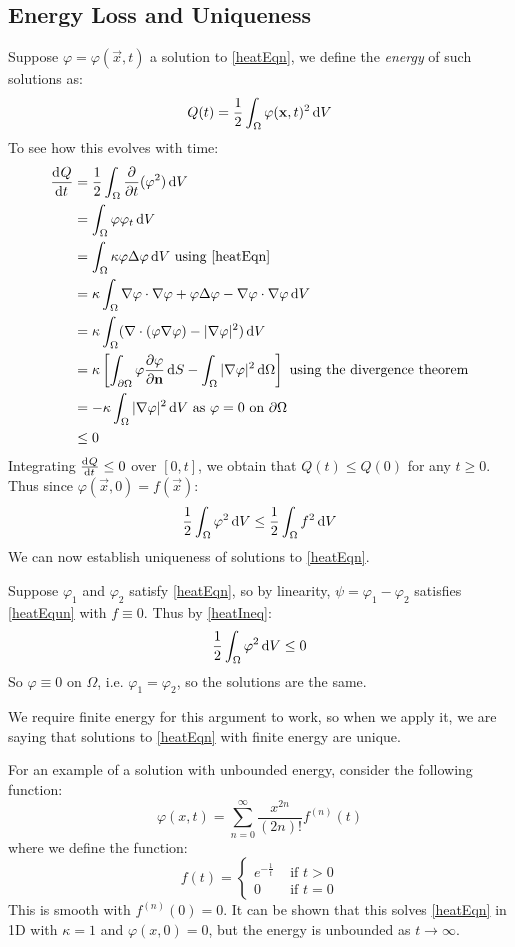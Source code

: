 \documentclass[../main.tex]{subfiles}
\begin{document}
\subsection{Energy Loss and Uniqueness}
Suppose $\varphi = \varphi(\vec{x}, t)$ a solution to \cref{heatEqn}, we define the \textit{energy} of such solutions as:
\[
  Q(t) = \frac{1}{2} \int_{\Omega} \varphi(\vec{x}, t)^2 \d{V}
\]
To see how this evolves with time:
\begin{align*}
  \deriv{Q}{t} &= \frac{1}{2} \int_{\Omega} \pderiv{}{t}(\varphi^2) \d{V} \\
               &= \int_{\Omega} \varphi \varphi_t \d{V} \\
               &= \int_{\Omega} \kappa \varphi \Delta \varphi \d{V} \text{ using \cref{heatEqn}} \\
               &= \kappa \int_{\Omega} \nabla \varphi \cdot \nabla \varphi + \varphi \Delta \varphi - \nabla \varphi \cdot \nabla \varphi \d{V} \\
               &= \kappa \int_{\Omega} (\nabla \cdot (\varphi \nabla \varphi) - |\nabla \varphi|^2) \d{V} \\
               &= \kappa \left[\int_{\partial \Omega} \varphi \pderiv{\varphi}{\vec{n}} \d{S} - \int_{\Omega}  |\nabla \varphi|^2 \d{\Omega}\right] \text{ using the divergence theorem} \\
               &= -\kappa \int_{\Omega} |\nabla \varphi|^2 \d{V} \text{ as $\varphi = 0$ on $\partial \Omega$} \\
               &\leq 0
\end{align*}
Integrating $\deriv{Q}{t} \leq 0$ over $[0, t]$, we obtain that $Q(t) \leq Q(0)$ for any $t \geq 0$.
Thus since $\varphi(\vec{x}, 0) = f(\vec{x})$:
\begin{equation}
  \frac{1}{2} \int_{\Omega} \varphi^2 \d{V} \leq \frac{1}{2} \int_{\Omega} f^2 \d{V} \label{heatIneq}
\end{equation}
We can now establish uniqueness of solutions to \cref{heatEqn}.

Suppose $\varphi_1$ and $\varphi_2$ satisfy \cref{heatEqn}, so by linearity, $\psi = \varphi_1 - \varphi_2$ satisfies \cref{heatEqun} with $f \equiv 0$.
Thus by \cref{heatIneq}:
\[
  \frac{1}{2} \int_{\Omega} \varphi^2 \d{V} \leq 0
\]
So $\varphi \equiv 0$ on $\Omega$, i.e. $\varphi_1 = \varphi_2$, so the solutions are the same.
\begin{remark}
  \nonexaminable
  We require finite energy for this argument to work, so when we apply it, we are saying that solutions to \cref{heatEqn} with finite energy are unique.

  For an example of a solution with unbounded energy, consider the following function:
  \[
    \varphi(x, t) = \sum_{n = 0}^{\infty} \frac{x^{2n}}{(2n)!} f^{(n)}(t)
  \]
  where we define the function:
  \[
    f(t) = \begin{cases}
    e^{-\frac{1}{t}} & \text{ if } t > 0 \\
    0 & \text{ if } t = 0
    \end{cases}
  \]
  This is smooth with $f^{(n)}(0) = 0$.
  It can be shown that this solves \cref{heatEqn} in 1D with $\kappa = 1$ and $\varphi(x, 0) = 0$, but the energy is unbounded as $t \to \infty$.
\end{remark}
\end{document}
